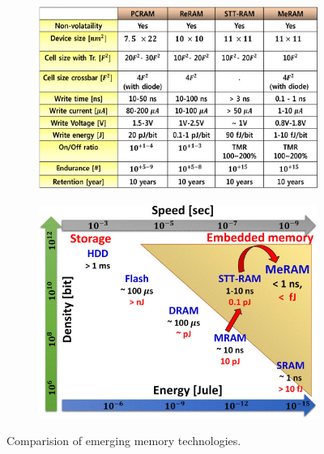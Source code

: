 \documentclass[a4paper, 12pt]{article}
\begin{document}
	\begin{figure}[H]
	\centering
		\begin{subfigure}[b]{0.5\linewidth}
			\includegraphics[scale=0.5]{Fig3.jpg}
		\end{subfigure}
		\begin{subfigure}[b]{0.5\linewidth}
			\includegraphics[scale=0.5]{Fig4.jpg}
		\end{subfigure}
		\caption {Comparision of emerging memory technologies.}
	\end{figure}
\end{document}
